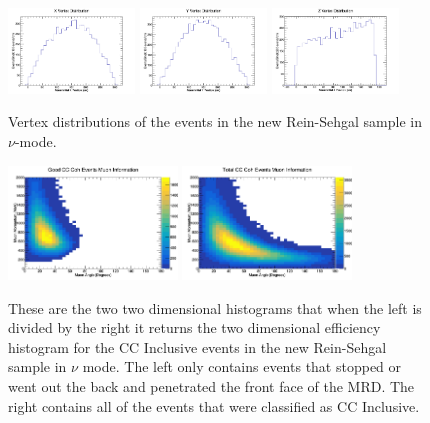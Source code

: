 \documentclass[11pt]{article}
\begin{document}
\begin{figure}[H]
\centering
\includegraphics[width=0.3\textwidth]{NewNMReinSehgalImages/4-XVertexDistributionNMRS.png}
\includegraphics[width=0.3\textwidth]{NewNMReinSehgalImages/3-YVertexDistributionNMRS.png}
\includegraphics[width=0.3\textwidth]{NewNMReinSehgalImages/2-ZVertexDistributionNMRS.png}
\caption{Vertex distributions of the events in the new Rein-Sehgal sample in $\nu$-mode.}
\end{figure}

\begin{figure}[H]
\centering
\includegraphics[width=0.4\textwidth]{NewNMReinSehgalImages/6-GoodCCCohMuonInfoNMRS.png}
\includegraphics[width=0.4\textwidth]{NewNMReinSehgalImages/9-TotalCCCohMuonInfoNMRS.png}
\caption{These are the two two dimensional histograms that when the left is divided by the right it returns the two dimensional efficiency histogram for the CC Inclusive events in the new Rein-Sehgal sample in $\nu$ mode. The left only contains events that stopped or went out the back and penetrated the front face of the MRD. The right contains all of the events that were classified as CC Inclusive.}
\end{figure}
\end{document}
